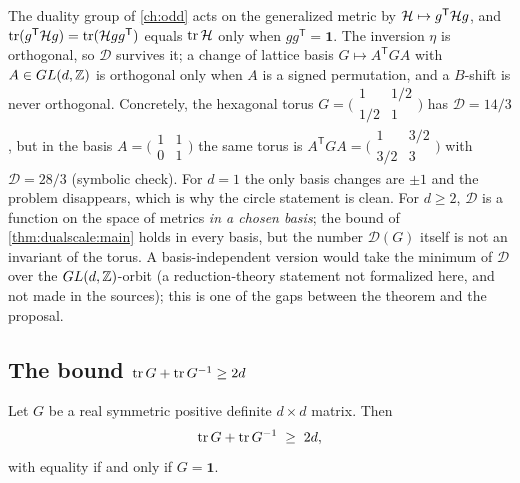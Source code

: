 \begin{pitfallbox}
The duality group of \cref{ch:odd} acts on the generalized metric by
$\mathcal{H}\mapsto g^{\mathsf T}\mathcal{H} g$, and $\operatorname{tr}(g^{\mathsf T}\mathcal{H} g)=\operatorname{tr}(\mathcal{H} gg^{\mathsf T})$ equals
$\operatorname{tr}\mathcal{H}$ only when $gg^{\mathsf T}=\mathbf1$. The inversion $\eta$ is orthogonal, so
$\mathcal D$ survives it; a change of lattice basis $G\mapsto A^{\mathsf T}GA$ with
$A\in GL(d,\mathbb{Z})$ is orthogonal only when $A$ is a signed permutation, and a $B$-shift is never
orthogonal. Concretely, the hexagonal torus
$G=\big(\begin{smallmatrix}1&1/2\\1/2&1\end{smallmatrix}\big)$ has $\mathcal D=14/3$, but in
the basis $A=\big(\begin{smallmatrix}1&1\\0&1\end{smallmatrix}\big)$ the same torus is
$A^{\mathsf T}GA=\big(\begin{smallmatrix}1&3/2\\3/2&3\end{smallmatrix}\big)$ with
$\mathcal D=28/3$ (symbolic check). For $d=1$ the only basis changes are $\pm1$ and the
problem disappears, which is why the circle statement is clean. For $d\ge2$, $\mathcal D$ is a
function on the space of metrics \emph{in a chosen basis}; the bound of
\cref{thm:dualscale:main} holds in every basis, but the number $\mathcal D(G)$ itself is not an
invariant of the torus. A basis-independent version would take the minimum of $\mathcal D$ over
the $GL(d,\mathbb{Z})$-orbit (a reduction-theory statement not formalized here, and not made in the
sources); this is one of the gaps between the theorem and the proposal.
\end{pitfallbox}

\subsection{The bound \texorpdfstring{$\operatorname{tr} G+\operatorname{tr} G^{-1}\ge2d$}{tr G + tr G inverse >= 2d}}

\begin{theorem}\label{thm:dualscale:main}
Let $G$ be a real symmetric positive definite $d\times d$ matrix. Then
\begin{equation}\label{eq:dualscale:bound}
 \operatorname{tr} G+\operatorname{tr} G^{-1}\;\ge\;2d,
\end{equation}
with equality if and only if $G=\mathbf1$.
\end{theorem}


